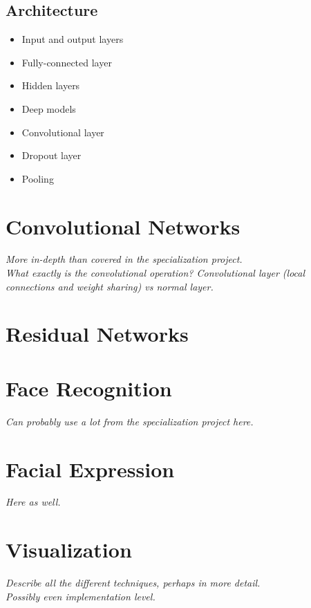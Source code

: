 \subsection{Architecture}

\begin{itemize}
    \item Input and output layers
    \item Fully-connected layer
    \item Hidden layers
    \item Deep models
    \item Convolutional layer
    \item Dropout layer
    \item Pooling
\end{itemize}

\section{Convolutional Networks}

\textit{More in-depth than covered in the specialization project. \\
What exactly is the convolutional operation? Convolutional layer (local connections and weight sharing) vs normal layer.}

\section{Residual Networks}

\section{Face Recognition}

\textit{Can probably use a lot from the specialization project here.}

\section{Facial Expression}

\textit{Here as well.}

\section{Visualization}

\textit{Describe all the different techniques, perhaps in more detail. \\
Possibly even implementation level.}

\cleardoublepage